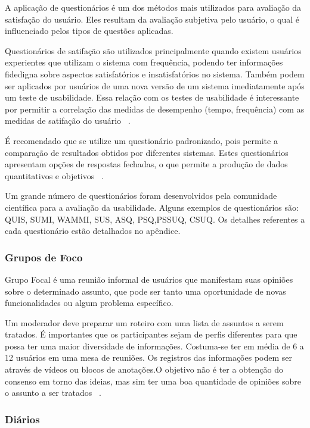 	A aplicação de questionários é um dos métodos mais utilizados para avaliação da satisfação do usuário. Eles resultam da avaliação subjetiva pelo usuário, o qual é influenciado pelos tipos de questões aplicadas.
	
	Questionários de satifação são utilizados principalmente quando existem usuários experientes que utilizam o sistema com frequência, podendo ter informações fidedigna sobre aspectos satisfatórios e insatisfatórios no sistema. Também podem ser aplicados por usuários de uma nova versão de um sistema imediatamente após um teste de usabilidade. Essa relação com os testes de usabilidade é interessante por permitir a correlação das medidas de desempenho (tempo, frequência) com as medidas de satifação do usuário ~\cite{cybis2010}.

	É recomendado que se utilize um questionário padronizado, pois permite a comparação de resultados obtidos por diferentes sistemas. Estes questionários apresentam opções de respostas fechadas, o que permite a produção de dados quantitativos e objetivos ~\cite{cybis2010}.

	Um grande número de questionários foram desenvolvidos pela comunidade científica para a avaliação da usabilidade.  Alguns exemplos de questionários são: QUIS, SUMI,  WAMMI, SUS, ASQ, PSQ,PSSUQ, CSUQ. Os detalhes referentes a cada questionário estão detalhados no apêndice.

\subsubsection{Grupos de Foco}

	Grupo Focal é uma reunião informal de usuários que manifestam suas opiniões sobre o determinado assunto, que pode ser tanto uma oportunidade de novas funcionalidades ou algum problema específico.

	Um moderador deve preparar um roteiro  com uma lista de assuntos a serem tratados. É importantes que os participantes sejam de perfis diferentes para que possa ter uma maior diversidade de informações. Costuma-se ter em média de 6 a 12 usuários em uma mesa de reuniões. Os registros das informações podem ser através de vídeos ou blocos de anotações.O objetivo não é ter a obtenção do consenso em torno das ideias, mas sim ter uma boa quantidade de opiniões sobre o assunto a ser tratados ~\cite{cybis2010}.


\subsubsection{Diários}

